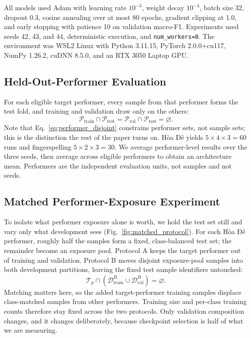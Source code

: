 All models used Adam with learning rate $10^{-3}$, weight decay $10^{-4}$, batch size 32, dropout 0.3, cosine annealing over at most 80 epochs, gradient clipping at 1.0, and early stopping with patience 10 on validation macro-F1. Experiments used seeds 42, 43, and 44, deterministic execution, and \texttt{num\_workers=0}. The environment was WSL2 Linux with Python 3.11.15, PyTorch 2.0.0+cu117, NumPy 1.26.2, cuDNN 8.5.0, and an RTX 3050 Laptop GPU.

\subsection{Held-Out-Performer Evaluation}

For each eligible target performer, every sample from that performer forms the test fold, and training and validation draw only on the others:
\begin{equation}
\mathcal{P}_{\mathrm{train}}\cap\mathcal{P}_{\mathrm{test}}
=
\mathcal{P}_{\mathrm{val}}\cap\mathcal{P}_{\mathrm{test}}
=
\varnothing.
\label{eq:performer_disjoint}
\end{equation}
Note that Eq.~\eqref{eq:performer_disjoint} constrains performer sets, not sample sets; this is the distinction the rest of the paper turns on. Hòa Đê yields $5\times4\times3=60$ runs and fingerspelling $5\times2\times3=30$. We average performer-level results over the three seeds, then average across eligible performers to obtain an architecture mean. Performers are the independent evaluation units, not samples and not seeds.

\subsection{Matched Performer-Exposure Experiment}

To isolate what performer exposure alone is worth, we hold the test set still and vary only what development sees (Fig.~\ref{fig:matched_protocol}). For each Hòa Đê performer, roughly half the samples form a fixed, class-balanced test set; the remainder become an exposure pool. Protocol A keeps the target performer out of training and validation. Protocol B moves disjoint exposure-pool samples into both development partitions, leaving the fixed test sample identifiers untouched:
\begin{equation}
\mathcal{T}_p\cap
\left(
\mathcal{D}^{B}_{\mathrm{train}}\cup
\mathcal{D}^{B}_{\mathrm{val}}
\right)=\varnothing.
\label{eq:test_disjoint}
\end{equation}
Matching matters here, so the added target-performer training samples displace class-matched samples from other performers. Training size and per-class training counts therefore stay fixed across the two protocols. Only validation composition changes, and it changes deliberately, because checkpoint selection is half of what we are measuring.

